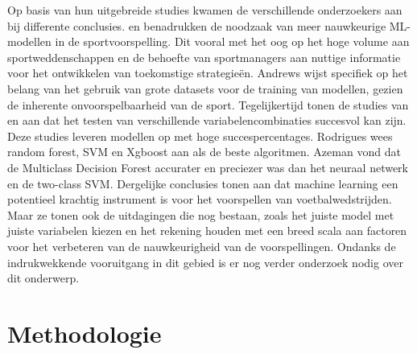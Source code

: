 Op basis van hun uitgebreide studies kwamen de verschillende onderzoekers aan bij differente conclusies.
\textcite{Bunker2019} en \textcite{Andrews2021} benadrukken de noodzaak van meer nauwkeurige ML-modellen in de sportvoorspelling. Dit vooral met het oog op het hoge volume aan sportweddenschappen en de behoefte van sportmanagers aan nuttige informatie voor het ontwikkelen van toekomstige strategieën. Andrews wijst specifiek op het belang van het gebruik van grote datasets voor de training van modellen, gezien de inherente onvoorspelbaarheid van de sport.
Tegelijkertijd tonen de studies van \textcite{Rodrigues2022} en \textcite{Azeman2022} aan dat het testen van verschillende variabelencombinaties succesvol kan zijn. Deze studies leveren modellen op met hoge succespercentages. Rodrigues wees random forest, SVM en Xgboost aan als de beste algoritmen. Azeman vond dat de Multiclass Decision Forest accurater en preciezer was dan het neuraal netwerk en de two-class SVM.
Dergelijke conclusies tonen aan dat machine learning een potentieel krachtig instrument is voor het voorspellen van voetbalwedstrijden. Maar ze tonen ook de uitdagingen die nog bestaan, zoals het juiste model met juiste variabelen kiezen en het rekening houden met een breed scala aan factoren voor het verbeteren van de nauwkeurigheid van de voorspellingen. Ondanks de indrukwekkende vooruitgang in dit gebied is er nog verder onderzoek nodig over dit onderwerp.



\section{Methodologie}%
\label{sec:methodologie}

